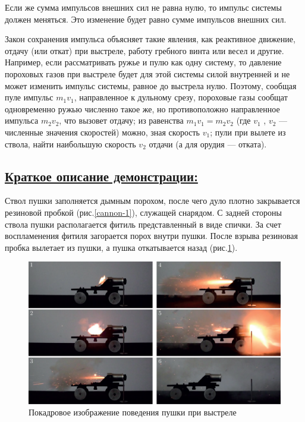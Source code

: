 \documentclass[14pt,a4paper,oneside]{extarticle}	%
\begin{document}
Если же сумма импульсов внешних сил не равна нулю, то импульс системы должен меняться. 
Это изменение будет равно сумме импульсов внешних сил.

Закон сохранения импульса объясняет такие явления, как реактивное движение, отдачу (или откат) при выстреле, работу гребного винта или весел и другие.
Например, если рассматривать ружье и пулю как одну систему, то давление пороховых газов при выстреле будет для этой системы силой внутренней и не может изменить импульс системы, равное до выстрела нулю. Поэтому, сообщая пуле импульс $ m_{1}v_{1} $, направленное к дульному срезу, пороховые газы сообщат одновременно ружью численно такое же, но противоположно направленное импульса $ m_{2}v_{2} $, что вызовет отдачу; из равенства  $ m_{1}v_{1} = m_{2}v_{2} $ (где $ v_{1} $ , $ v_{2} $ — численные значения скоростей) можно, зная скорость $ v_{1} $; пули при вылете из ствола, найти наибольшую скорость $ v_{2} $ отдачи (а для орудия — отката).

\newpage
\subsection*{\underline{Краткое описание демонстрации:}}

Ствол пушки заполняется дымным порохом, после чего дуло плотно закрывается резиновой пробкой (рис.\ref{cannon-1}), служащей снарядом.
С задней стороны ствола пушки располагается фитиль представленный в виде спички.
За счет воспламенения фитиля загорается порох внутри пушки.
После взрыва резиновая пробка вылетает из пушки, а пушка откатывается назад (рис.\ref{cannon-2}).

\begin{figure}[H] 
	\centering 	
	\includegraphics[width=0.9\linewidth]{cannon-2.png}
	\caption{Покадровое изображение поведения пушки при выстреле}
	\label{cannon-2}
\end{figure}
\end{document}
